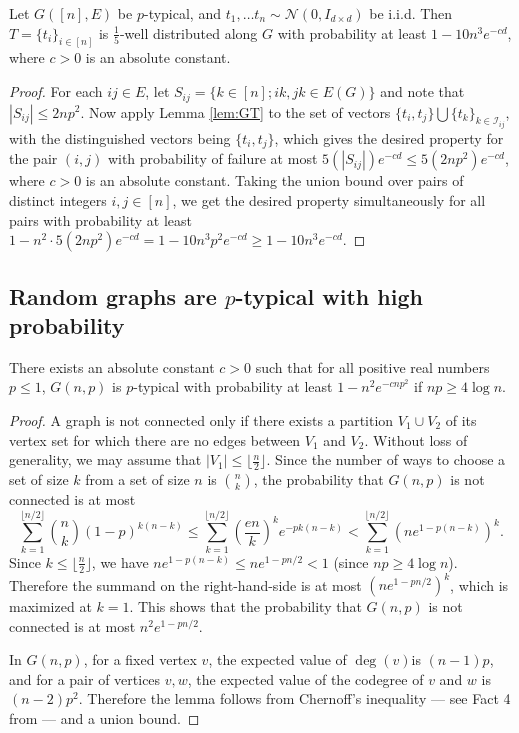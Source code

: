 \begin{lemma} \label{lem:ptyp-well}
Let $G([n],E)$ be $p$-typical, and $t_1,\ldots t_n \sim \mathcal{N}(0,I_{d\times d})$ be i.i.d. Then $T = \{t_i\}_{i \in [n]}$ is $\frac{1}{5}$-well distributed along $G$ with probability at least $1-10n^3 e^{-cd}$, where $c>0$ is an absolute constant. 
\end{lemma}
\begin{proof}
For each $ij \in E$, let $S_{ij} = \{ k \in [n]; ik, jk \in E(G) \}$ and note that $|S_{ij}| \leq 2np^2$. Now apply Lemma \ref{lem:GT} to the set of vectors $ \{t_i, t_j\} \bigcup \{ t_k \}_{k \in \mathcal{I}_{ij}}$, with the distinguished vectors being $\{t_i, t_j\}$, which gives the desired property for the pair $(i,j)$ with probability of failure at most $5(|S_{ij}|)e^{-cd} \leq 5 (2np^2) e^{-cd}$, where $c>0$ is an absolute constant. Taking the union bound over pairs of distinct integers $i,j \in [n]$, we get the desired property simultaneously for all pairs with probability at least $1- n^2 \cdot 5(2np^2) e^{-cd} = 1 - 10n^3 p^2 e^{-cd} \geq 1- 10n^3 e^{-cd}$.
\end{proof}

\subsection{Random graphs are $p$-typical with high probability} \label{sec-random-graph}



\begin{lemma} \label{lem:ptyp}
There exists an absolute constant $c > 0$ such that for all positive real numbers $p \le 1$, $G(n,p)$ is $p$-typical with probability at least $1-n^2e^{-cnp^2}$ if $np \ge 4 \log n$.
\end{lemma}
\begin{proof}
A graph is not connected only if there exists a partition $V_1 \cup V_2$ of its vertex
set for which there are no edges between $V_1$ and $V_2$. Without loss of generality,
we may assume that $|V_1| \le \lfloor \frac{n}{2} \rfloor$. Since the number
of ways to choose a set of size $k$ from a set of size $n$ is ${n \choose k}$, 
the probability that $G(n,p)$ is not connected is at most 
\[
	\sum_{k=1}^{\lfloor n/2 \rfloor} {n \choose k} (1-p)^{k(n-k)}
	\le \sum_{k=1}^{\lfloor n/2 \rfloor} \left(\frac{en}{k}\right)^{k} e^{-pk(n-k)}
	< \sum_{k=1}^{\lfloor n/2 \rfloor} \left(n e^{1-p(n-k)} \right)^{k}.
\]
Since $k \le \lfloor \frac{n}{2} \rfloor$, we have
$n e^{1-p(n-k)} \le n e^{1-pn/2} < 1$ (since $np \ge 4 \log n$). 
Therefore the summand on the right-hand-side is at most $(ne^{1-pn/2})^{k}$,
which is maximized at $k=1$. 
This shows that the probability that $G(n,p)$ is not connected is at most $n^2 e^{1-pn/2}$.

In $G(n,p)$, for a fixed vertex $v$, the expected value of $\deg(v)$is
$(n-1)p$, and for a pair of vertices $v,w$, the expected value of
the codegree of $v$ and $w$ is $(n-2)p^{2}$. Therefore the lemma
follows from Chernoff's inequality --- see Fact 4 from  \cite{AngluinValiant} --- and a union bound. 
\end{proof}





